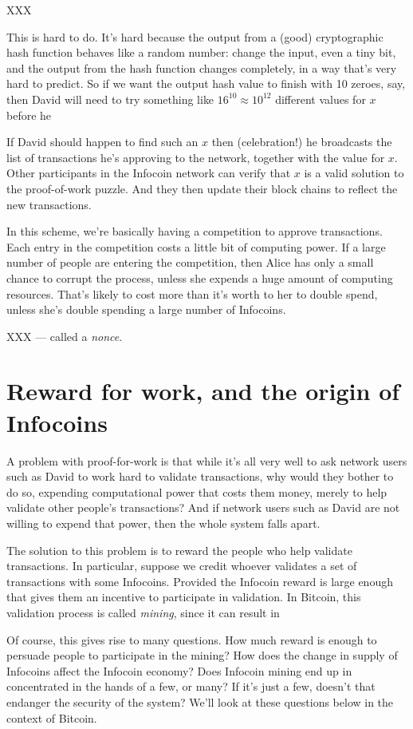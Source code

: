 \documentclass[12pt]{book}
\newcounter{problem}[chapter]
\begin{document}
XXX

This is hard to do.  It's hard because the output from a (good)
cryptographic hash function behaves like a random number: change the
input, even a tiny bit, and the output from the hash function changes
completely, in a way that's very hard to predict.  So if we want the
output hash value to finish with 10 zeroes, say, then David will
need to try something like $16^{10} \approx 10^{12}$ different values
for $x$ before he 

If David should happen to find such an $x$ then (celebration!)  he
broadcasts the list of transactions he's approving to the network,
together with the value for $x$.  Other participants in the Infocoin
network can verify that $x$ is a valid solution to the proof-of-work
puzzle.  And they then update their block chains to reflect the new
transactions.

In this scheme, we're basically having a competition to approve
transactions.  Each entry in the competition costs a little bit of
computing power.  If a large number of people are entering the
competition, then Alice has only a small chance to corrupt the
process, unless she expends a huge amount of computing resources.
That's likely to cost more than it's worth to her to double spend,
unless she's double spending a large number of Infocoins.

XXX --- called a \emph{nonce}.  

\section{Reward for work, and the origin of Infocoins}

A problem with proof-for-work is that while it's all very well to ask
network users such as David to work hard to validate transactions, why
would they bother to do so, expending computational power that costs
them money, merely to help validate other people's transactions?  And
if network users such as David are not willing to expend that power,
then the whole system falls apart.

The solution to this problem is to reward the people who help validate
transactions.  In particular, suppose we credit whoever validates a
set of transactions with some Infocoins.  Provided the Infocoin reward
is large enough that gives them an incentive to participate in
validation.  In Bitcoin, this validation process is called
\emph{mining}, since it can result in 

Of course, this gives rise to many questions.  How much reward is
enough to persuade people to participate in the mining?  How does the
change in supply of Infocoins affect the Infocoin economy?  Does
Infocoin mining end up in concentrated in the hands of a few, or many?
If it's just a few, doesn't that endanger the security of the system?
We'll look at these questions below in the context of Bitcoin.
\end{document}

